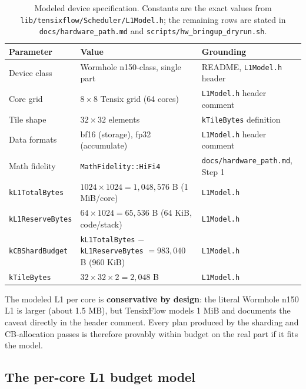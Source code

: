 \begin{table}[htbp]
  \centering
  \caption{Modeled device specification. Constants are the exact values from
  \texttt{lib/tensixflow/Scheduler/L1Model.h}; the remaining rows are stated
  in \texttt{docs/hardware\_path.md} and \texttt{scripts/hw\_bringup\_dryrun.sh}.}
  \label{tab:hardware-device-spec}
  \begin{tabular}{@{}lp{4.0cm}p{4.6cm}@{}}
    \toprule
    \textbf{Parameter} & \textbf{Value} & \textbf{Grounding} \\
    \midrule
    Device class & Wormhole n150-class, single part & README, \texttt{L1Model.h} header \\
    Core grid & $8 \times 8$ Tensix grid (64 cores) & \texttt{L1Model.h} header comment \\
    Tile shape & $32 \times 32$ elements & \texttt{kTileBytes} definition \\
    Data formats & bf16 (storage), fp32 (accumulate) & \texttt{L1Model.h} header comment \\
    Math fidelity & \texttt{MathFidelity::HiFi4} & \texttt{docs/hardware\_path.md}, Step 1 \\
    \texttt{kL1TotalBytes} & $1024 \times 1024 = 1{,}048{,}576$ B (1 MiB/core) & \texttt{L1Model.h} \\
    \texttt{kL1ReserveBytes} & $64 \times 1024 = 65{,}536$ B (64 KiB, code/stack) & \texttt{L1Model.h} \\
    \texttt{kCBShardBudget} & \texttt{kL1TotalBytes} $-$ \texttt{kL1ReserveBytes} $= 983{,}040$ B (960 KiB) & \texttt{L1Model.h} \\
    \texttt{kTileBytes} & $32 \times 32 \times 2 = 2{,}048$ B & \texttt{L1Model.h} \\
    \bottomrule
  \end{tabular}
\end{table}

The modeled L1 per core is \textbf{conservative by design}: the literal
Wormhole n150 L1 is larger (about 1.5 MB), but TensixFlow models 1 MiB and
documents the caveat directly in the header comment. Every plan produced by
the sharding and CB-allocation passes is therefore provably within budget on
the real part if it fits the model.

\subsection{The per-core L1 budget model}

